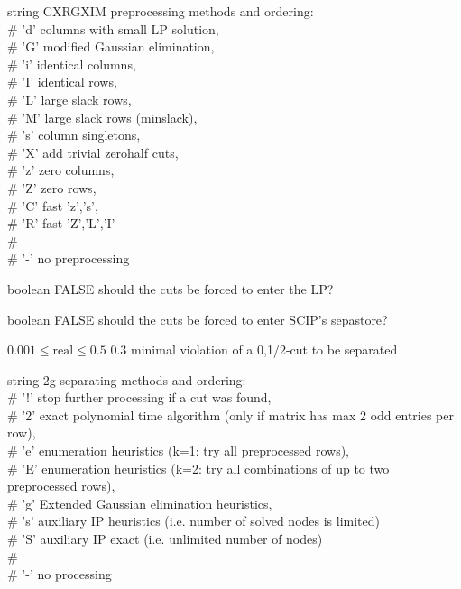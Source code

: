 %
{string}%
{CXRGXIM}%
{preprocessing methods and ordering:\\   \#                      'd' columns with small LP solution,\\    \#                      'G' modified Gaussian elimination,\\     \#                      'i' identical columns,\\   \#                      'I' identical rows,\\   \#                      'L' large slack rows,\\   \#                      'M' large slack rows (minslack),\\   \#                      's' column singletons,\\   \#                      'X' add trivial zerohalf cuts,\\   \#                      'z' zero columns,\\   \#                      'Z' zero rows,\\   \#                      'C' fast {'z','s'},\\   \#                      'R' fast {'Z','L','I'}\\   \#                      \\                         \#                      '-' no preprocessing                     }%
{}

%
{boolean}%
{FALSE}%
{should the cuts be forced to enter the LP?}%
{}

%
{boolean}%
{FALSE}%
{should the cuts be forced to enter SCIP's sepastore?}%
{}

%
{$0.001\leq\textrm{real}\leq0.5$}%
{$0.3$}%
{minimal violation of a {0,1/2}-cut to be separated}%
{}

%
{string}%
{2g}%
{separating methods and ordering:\\   \#                      '!' stop further processing if a cut was found,\\   \#                      '2' exact polynomial time algorithm (only if matrix has max 2 odd entries per row),\\   \#                      'e' enumeration heuristics (k=1: try all preprocessed rows),\\   \#                      'E' enumeration heuristics (k=2: try all combinations of up to two preprocessed rows),\\   \#                      'g' Extended Gaussian elimination heuristics,\\   \#                      's' auxiliary IP heuristics (i.e. number of solved nodes is limited)\\   \#                      'S' auxiliary IP exact      (i.e. unlimited number of nodes)\\   \#                      \\   \#                      '-' no processing                     }%
{}

